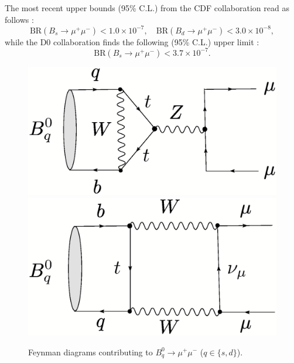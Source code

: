 \documentclass[12pt]{article}
\begin{document}
The most recent upper bounds (95\% C.L.) from the CDF collaboration
read as follows
\cite{CDF-Bmumu}:
\begin{equation}\label{Bmumu-exp-CDF}
\mbox{BR}(B_s\to\mu^+\mu^-)<1.0\times10^{-7}, \quad
\mbox{BR}(B_d\to\mu^+\mu^-)<3.0 \times10^{-8},
\end{equation}
while the D0 collaboration finds the following (95\% C.L.) upper limit \cite{D0-Bmumu}:
\begin{equation}\label{Bmumu-exp-D0}
\mbox{BR}(B_s\to\mu^+\mu^-)<3.7\times10^{-7}.
\end{equation}


\begin{figure}[t]
\centerline{
 \includegraphics[width=4.6truecm]{Bqmumu-pen.ps}
 \hspace*{0.5truecm}
 \includegraphics[width=4.3truecm]{Bqmumu-box.ps}  
 }
\caption{Feynman diagrams contributing to 
$B^0_q\to \mu^+\mu^-$ ($q\in\{s,d\}$).}\label{fig:Bqmumu}
\end{figure}
\end{document}
